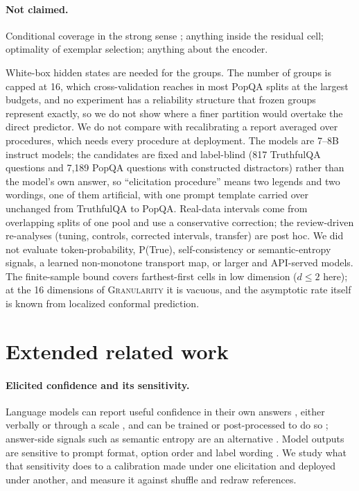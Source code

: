 \documentclass[twoside]{article}
\theoremstyle{definition}
\theoremstyle{remark}
\newcommand{\1}{\mathbf{1}}
\newcommand{\expname}[1]{\textsc{#1}}
\begin{document}
\paragraph{Not claimed.}
Conditional coverage in the strong sense \citep{barber2021limits}; anything
inside the residual cell; optimality of exemplar selection; anything about the
encoder.

White-box hidden states are needed for the groups. The number of groups is
capped at 16, which cross-validation reaches in most PopQA splits at the largest budgets, and no
experiment has a reliability structure that frozen groups represent exactly, so we do not show where a
finer partition would overtake the direct predictor. We do not compare with recalibrating a report
averaged over procedures, which needs every procedure at deployment. The models are 7--8B
instruct models; the candidates are fixed and label-blind (817 TruthfulQA questions and 7{,}189 PopQA
questions with constructed distractors) rather than the model's own answer, so ``elicitation
procedure'' means two legends and two wordings, one of them artificial, with one prompt template
carried over unchanged from TruthfulQA to PopQA. Real-data intervals
come from overlapping splits of one pool and use a conservative correction; the review-driven
re-analyses (tuning, controls, corrected intervals, transfer) are post hoc. We did not evaluate
token-probability, P(True), self-consistency or semantic-entropy signals, a learned non-monotone transport
map, or larger and API-served models. The finite-sample bound covers farthest-first cells in low
dimension ($d\le2$ here); at the 16 dimensions of \expname{Granularity} it is vacuous, and the asymptotic rate itself is
known from localized conformal prediction.

\section{Extended related work}
\label{app:related}
\paragraph{Elicited confidence and its sensitivity.} Language models can report useful confidence
in their own answers \citep{kadavath2022language,jiang2021how}, either verbally or through a scale
\citep{lin2022teaching,tian2023just,xiong2024can}, and can be trained or post-processed to do so
\citep{kapoor2024large,ulmer2024calibrating}; answer-side signals such as semantic entropy are an
alternative \citep{kuhn2023semantic}. Model outputs are sensitive to prompt format, option order and
label wording \citep{zhao2021calibrate,sclar2024quantifying,zheng2024large,pezeshkpour2024large}. We
study what that sensitivity does to a calibration made under one elicitation and deployed under
another, and measure it against shuffle and redraw references.
\end{document}
